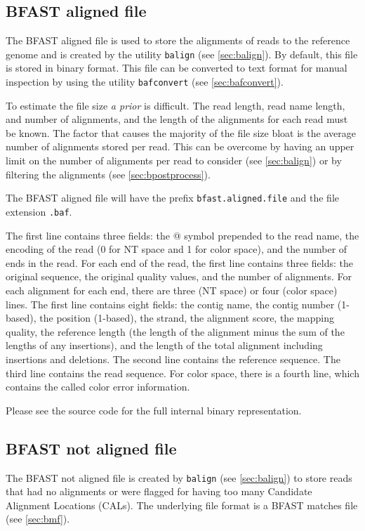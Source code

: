 \documentclass[a4paper,12pt]{book}
\newcommand{\TT}[1]{{\tt #1}} %
\newcommand{\IF}[1]{{\it #1}} %
\newcommand{\BMF}{BFAST matches file} %
\newcommand{\BAF}{BFAST aligned file} %
\newcommand{\BNAF}{BFAST not aligned file} %
\begin{document}
\subsection{\BAF{}}
\label{sec:baf} 
The \BAF{} is used to store the alignments of reads to the reference genome and is created by the utility \TT{balign} (see \autoref{sec:balign}).
By default, this file is stored in binary format.
This file can be converted to text format for manual inspection by using the utility \TT{bafconvert} (see \autoref{sec:bafconvert}).

To estimate the file size \IF{a prior} is difficult.
The read length, read name length, and number of alignments, and the length of the alignments for each read must be known.
The factor that causes the majority of the file size bloat is the average number of alignments stored per read.
This can be overcome by having an upper limit on the number of alignments per read to consider (see \autoref{sec:balign}) or by filtering the alignments (see \autoref{sec:bpostprocess}).

The \BAF{} will have the prefix \TT{bfast.aligned.file} and the file extension \TT{.baf}.

The first line contains three fields: the @ symbol prepended to the read name, the encoding of the read (0 for NT space and 1 for color space), and the number of ends in the read.
For each end of the read, the first line contains three fields: the original sequence, the original quality values, and the number of alignments.
For each alignment for each end, there are three (NT space) or four (color space) lines.
The first line contains eight fields: the contig name, the contig number (1-based), the position (1-based), the strand, the alignment score, the mapping quality, the reference length (the length of the alignment minus the sum of the lengths of any insertions), and the length of the total alignment including insertions and deletions.
The second line contains the reference sequence.
The third line contains the read sequence.
For color space, there is a fourth line, which contains the called color error information.

Please see the source code for the full internal binary representation.

\subsection{\BNAF{}}
\label{sec:bnaf}
The \BNAF{} is created by \TT{balign} (see \autoref{sec:balign}) to store reads that had no alignments or were flagged for having too many Candidate Alignment Locations (CALs).
The underlying file format is a \BMF{} (see \autoref{sec:bmf}).
\end{document}
